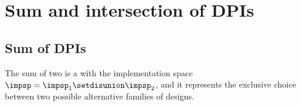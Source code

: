 

\section{Sum and intersection of DPIs}
\label{subsec:dpi-intersection}

\subsection{Sum of DPIs}\label{subsec:dpi-union}

The sum of two  is a  with the implementation space~$\impsp=\impsp_{1}\setdisunion\impsp_{2}$, and it represents the exclusive choice between two possible alternative families of designs.

\begin{marginfigure}
    \centering
    \caption{}
    \label{fig:dpcoproduct}
\end{marginfigure}

